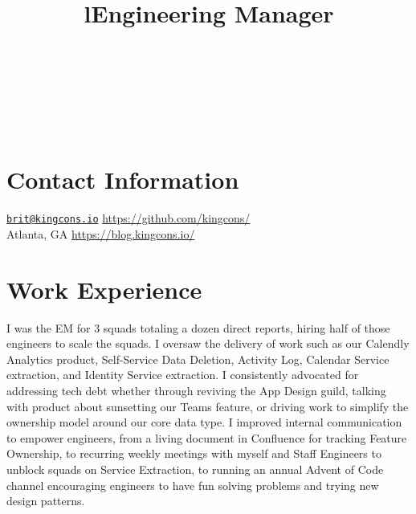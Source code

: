 \documentclass[margintitle,line]{res}
\begin{document}

\begin{resume}

\begin{format}
\\
\title{l}\\
\body\\
\end{format}



\section{Contact Information}

\href{mailto:brit@kingcons.io}{\nolinkurl{brit@kingcons.io}} \hfill
\url{https://github.com/kingcons/} \\
Atlanta, GA \hfill
\url{https://blog.kingcons.io/} \\


\section{Work Experience}

\title{Engineering Manager}
\begin{position}
  I was the EM for 3 squads totaling a dozen direct reports, hiring half of those engineers to scale the squads.
  I oversaw the delivery of work such as our Calendly Analytics product, Self-Service Data Deletion, Activity Log, Calendar Service extraction, and Identity Service extraction.
  I consistently advocated for addressing tech debt whether through reviving the App Design guild, talking with product about sunsetting our Teams feature, or driving work to simplify the ownership model around our core data type.
  I improved internal communication to empower engineers, from a living document in Confluence for tracking Feature Ownership, to recurring weekly meetings with myself and Staff Engineers to unblock squads on Service Extraction, to running an annual Advent of Code channel encouraging engineers to have fun solving problems and trying new design patterns.
\end{position}


\end{resume}
\end{document}
